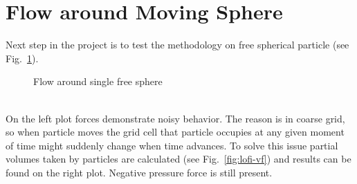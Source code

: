 \section{Flow around Moving Sphere}
Next step in the project is to test the methodology on free spherical particle (see Fig.~\ref{fig:lofi_single_vf}).
\begin{figure}[h!]
\begin{minipage}{0.5\linewidth}
\end{minipage}
\begin{minipage}{0.5\linewidth}
\end{minipage}
\caption{Flow around single free sphere} \label{fig:lofi_single_vf}
\end{figure}\\
On the left plot forces demonstrate noisy behavior. The reason is in coarse grid, so when particle moves the grid cell that particle occupies at any given moment of time might suddenly change when time advances. To solve this issue partial volumes taken by particles are calculated (see Fig.~\ref{fig:lofi-vf}) and results can be found on the right plot. Negative pressure force is still present.
